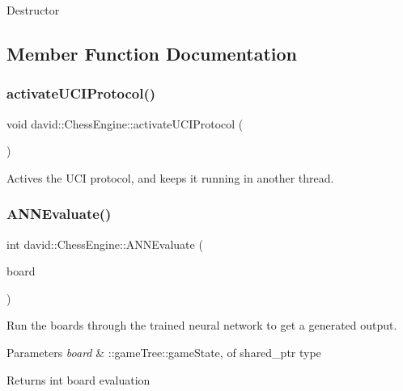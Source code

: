 Destructor 

\subsection{Member Function Documentation}
\mbox{\label{classdavid_1_1ChessEngine_acc39e613bf801c1ac1dfb8e0eee3d025}} 
\subsubsection{\texorpdfstring{activate\+U\+C\+I\+Protocol()}{activateUCIProtocol()}}
{\footnotesize\ttfamily void david\+::\+Chess\+Engine\+::activate\+U\+C\+I\+Protocol (\begin{DoxyParamCaption}{ }\end{DoxyParamCaption})}

Actives the U\+CI protocol, and keeps it running in another thread. \mbox{\label{classdavid_1_1ChessEngine_a3779b125c09306c2518b0a752a1e06c4}} 
\subsubsection{\texorpdfstring{A\+N\+N\+Evaluate()}{ANNEvaluate()}\hspace{0.1cm}{\footnotesize\ttfamily [1/2]}}
{\footnotesize\ttfamily int david\+::\+Chess\+Engine\+::\+A\+N\+N\+Evaluate (\begin{DoxyParamCaption}\item[{\hyperlink{structdavid_1_1bitboard_1_1gameState}{type\+::game\+State\+\_\+t} \&}]{board }\end{DoxyParamCaption})}

Run the boards through the trained neural network to get a generated output.


\begin{DoxyParams}{Parameters}
{\em board} & \+::game\+Tree\+::game\+State, of shared\+\_\+ptr type \\
\hline
\end{DoxyParams}
\begin{DoxyReturn}{Returns}
int board evaluation 
\end{DoxyReturn}
\mbox{\label{classdavid_1_1ChessEngine_a86fd8cfd367471192bc0061ae19b16af}} 
